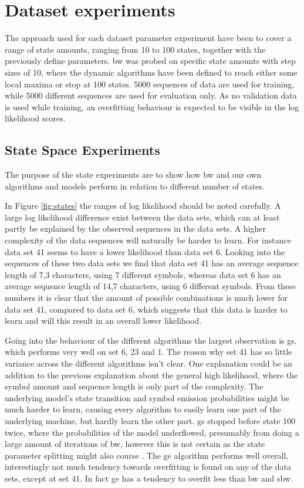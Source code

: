 \section{Dataset experiments}
\label{sec:dataset_experiments}
The approach used for each dataset parameter experiment have been to cover a range of state amounts, ranging from 10 to 100 states, together with the previously define parameters. \gls{bw} was probed on specific state amounts with step sizes of 10, where the dynamic algorithms have been defined to reach either some local maxima or stop at 100 states. 5000 sequences of data are used for training, while 5000 different sequences are used for evaluation only. As no validation data is used while training, an overfitting behaviour is expected to be visible in the log likelihood scores.

\subsection{State Space Experiments}

The purpose of the state experiments are to show how \gls{bw} and our own algorithms and models perform in relation to different number of states.

In Figure \ref{fig:states} the ranges of log likelihood should be noted carefully. A large log likelihood difference exist between the data sets, which can at least partly be explained by the observed sequences in the data sets. A higher complexity of the data sequences will naturally be harder to learn. For instance data set 41 seems to have a lower likelihood than data set 6. Looking into the sequences of these two data sets we find that data set 41 has an average sequence length of 7,3 characters, using 7 different symbols, whereas data set 6 has an average sequence length of 14,7 characters, using 6 different symbols. From these numbers it is clear that the amount of possible combinations is much lower for data set 41, compared to data set 6, which suggests that this data is harder to learn and will this result in an overall lower likelihood.

Going into the behaviour of the different algorithms the largest observation is \gls{gs}, which performs very well on set 6, 23 and 1. The reason why set 41 has so little variance across the different algorithms isn't clear. One explanation could be an addition to the previous explanation about the general high likelihood, where the symbol amount and sequence length is only part of the complexity. The underlying model's state transition and symbol emission probabilities might be much harder to learn, causing every algorithm to easily learn one part of the underlying machine, but hardly learn the other part. \gls{gs} stopped before state 100 twice, where the probabilities of the model underflowed, presumably from doing a large amount of iterations of \gls{bw}, however this is not certain as the state parameter splitting might also course .
The \gls{ge} algorithm performs well overall, interestingly not much tendency towards overfitting is found on any of the data sets, except at set 41. In fact \gls{ge} has a tendency to overfit less than \gls{bw} and \gls{sbw}.

